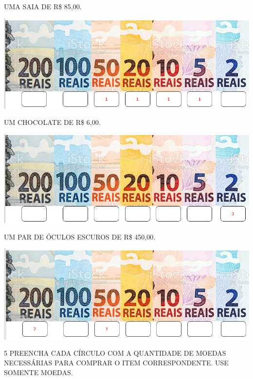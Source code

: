 \begin{escolha}
\item UMA SAIA DE R\$ 85,00.

\includegraphics[width=.8\textwidth]{media/image68.png}

\item UM CHOCOLATE DE R\$ 6,00.

\includegraphics[width=.8\textwidth]{media/image69.png}

\item UM PAR DE ÓCULOS ESCUROS DE R\$ 450,00.

\includegraphics[width=.8\textwidth]{media/image70.png}
\end{escolha}


\num{5} PREENCHA CADA CÍRCULO COM A QUANTIDADE DE MOEDAS NECESSÁRIAS PARA COMPRAR O ITEM CORRESPONDENTE. USE SOMENTE MOEDAS.


